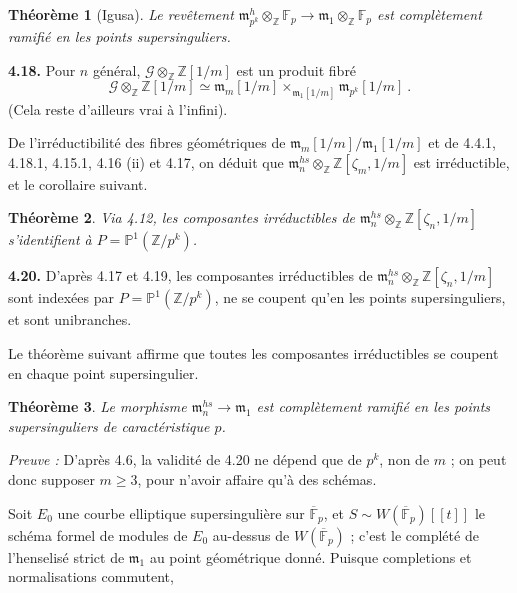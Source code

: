 \documentclass[10pt,a4paper]{amsart}
\theoremstyle{plain}
\newtheorem{theorem}{Th\'eor\`eme}[section]
\theoremstyle{definition}
\newcommand{\m}{\mathfrak{m}}
\newcommand{\cG}{\mathcal{G}}
\newcommand{\FF}{\mathbb{F}}
\newcommand{\ZZ}{\mathbb{Z}}
\begin{document}
\setcounter{theorem}{16}
\begin{theorem}[Igusa]
Le rev\^etement $\m_{p^k}^h \otimes_\ZZ \FF_p \to \m_1 \otimes_\ZZ \FF_p$ est compl\`etement ramifi\'e en les points supersinguliers.
\end{theorem}

\medskip\noindent\textbf{4.18.} Pour $n$ g\'en\'eral, $\cG \otimes_\ZZ \ZZ[1/m]$ est un produit fibr\'e
\begin{equation}
\cG \otimes_\ZZ \ZZ[1/m] \simeq \m_m[1/m] \times_{\m_1[1/m]} \m_{p^k}[1/m]\ .
\end{equation}
(Cela reste d'ailleurs vrai \`a l'infini).

De l'irr\'eductibilit\'e des fibres g\'eom\'etriques de $\m_m[1/m]/\m_1[1/m]$ et de 4.4.1, 4.18.1, 4.15.1, 4.16 (ii) et 4.17, on d\'eduit que $\m_n^{hs} \otimes_\ZZ \ZZ[\zeta_m, 1/m]$ est irr\'eductible, et le corollaire suivant.

\setcounter{theorem}{18}
\begin{theorem}
Via 4.12, les composantes irr\'eductibles de $\m_n^{hs} \otimes_\ZZ \ZZ[\zeta_n, 1/m]$ s'identifient \`a $P = \mathbb{P}^1(\ZZ/p^k)$.
\end{theorem}

\medskip\noindent\textbf{4.20.} D'apr\`es 4.17 et 4.19, les composantes irr\'eductibles de $\m_n^{hs} \otimes_\ZZ \ZZ[\zeta_n, 1/m]$ sont index\'ees par $P = \mathbb{P}^1(\ZZ/p^k)$, ne se coupent qu'en les points supersinguliers, et sont unibranches.

Le th\'eor\`eme suivant affirme que toutes les composantes irr\'eductibles se coupent en chaque point supersingulier.

\setcounter{theorem}{19}
\begin{theorem}
Le morphisme $\m_n^{hs} \to \m_1$ est compl\`etement ramifi\'e en les points supersinguliers de caract\'eristique $p$.
\end{theorem}

\noindent\emph{Preuve :} D'apr\`es 4.6, la validit\'e de 4.20 ne d\'epend que de $p^k$, non de $m$ ; on peut donc supposer $m \geq 3$, pour n'avoir affaire qu'\`a des sch\'emas.

Soit $E_0$ une courbe elliptique supersinguli\`ere sur $\overline{\FF}_p$, et $S \sim W(\overline{\FF}_p)[[t]]$ le sch\'ema formel de modules de $E_0$ au-dessus de $W(\overline{\FF}_p)$ ; c'est le compl\'et\'e de l'henselis\'e strict de $\m_1$ au point g\'eom\'etrique donn\'e. Puisque completions et normalisations commutent,
\end{document}
